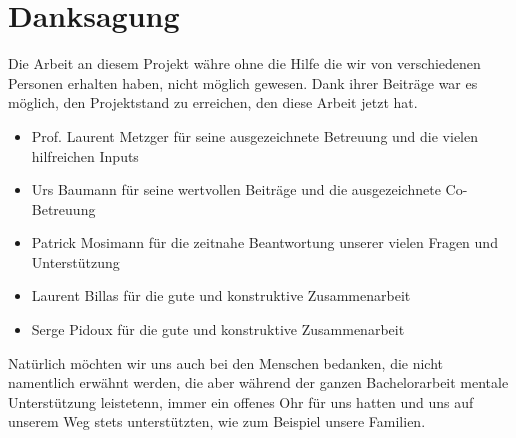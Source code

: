 \section{Danksagung}

Die Arbeit an diesem Projekt währe ohne die Hilfe die wir von verschiedenen Personen erhalten haben, nicht möglich gewesen. Dank ihrer Beiträge war es möglich, den Projektstand zu erreichen, den diese Arbeit jetzt hat.

\begin{itemize}
	\item Prof. Laurent Metzger für seine ausgezeichnete Betreuung und die vielen hilfreichen Inputs
	\item Urs Baumann für seine wertvollen Beiträge und die ausgezeichnete Co-Betreuung
	\item Patrick Mosimann für die zeitnahe Beantwortung unserer vielen Fragen und Unterstützung 
	\item Laurent Billas für die gute und konstruktive Zusammenarbeit
	\item Serge Pidoux für die gute und konstruktive Zusammenarbeit
\end{itemize}

Natürlich möchten wir uns auch bei den Menschen bedanken, die nicht namentlich erwähnt werden, die aber während der ganzen Bachelorarbeit mentale Unterstützung leistetenn, immer ein offenes Ohr für uns hatten und uns auf unserem Weg stets unterstützten, wie zum Beispiel unsere Familien.